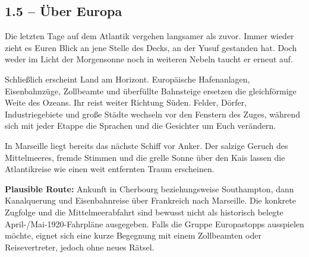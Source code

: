 \subsection{1.5 -- Über Europa}
\begin{vorlesetextalle}
Die letzten Tage auf dem Atlantik vergehen langsamer als zuvor. Immer wieder zieht es Euren Blick an jene Stelle des Decks, an der Yusuf gestanden hat. Doch weder im Licht der Morgensonne noch in weiteren Nebeln taucht er erneut auf.

Schlie\ss{}lich erscheint Land am Horizont. Europäische Hafenanlagen, Eisenbahnzüge, Zollbeamte und überfüllte Bahnsteige ersetzen die gleichförmige Weite des Ozeans. Ihr reist weiter Richtung Süden. Felder, Dörfer, Industriegebiete und gro\ss{}e Städte wechseln vor den Fenstern des Zuges, während sich mit jeder Etappe die Sprachen und die Gesichter um Euch verändern.

In Marseille liegt bereits das nächste Schiff vor Anker. Der salzige Geruch des Mittelmeeres, fremde Stimmen und die grelle Sonne über den Kais lassen die Atlantikreise wie einen weit entfernten Traum erscheinen.
\end{vorlesetextalle}
\begin{meisterinfo}
\textbf{Plausible Route:} Ankunft in Cherbourg beziehungsweise Southampton, dann Kanalquerung und Eisenbahnreise über Frankreich nach Marseille. Die konkrete Zugfolge und die Mittelmeerabfahrt sind bewusst nicht als historisch belegte April-/Mai-1920-Fahrpläne ausgegeben. Falls die Gruppe Europastopps ausspielen möchte, eignet sich eine kurze Begegnung mit einem Zollbeamten oder Reisevertreter, jedoch ohne neues Rätsel.
\end{meisterinfo}


